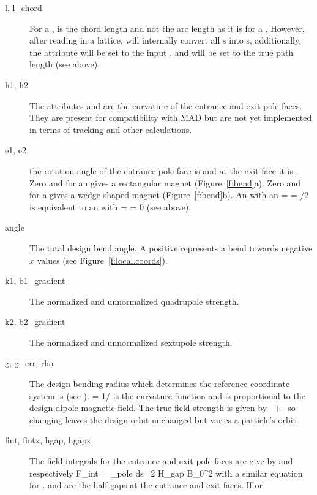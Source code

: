   \begin{description}
  \item[l, l_chord]  \Newline
For a ,  is the chord length and not the arc length as
it is for a .  However, after reading in a lattice, \bmad will
internally convert all s into s, additionally, the
 attribute will be set to the input , and  
will be set to the true path length (see above).
  \item[h1, h2] \Newline
The attributes  and  are the curvature of the entrance
and exit pole faces. They are present for compatibility with MAD but
are not yet implemented in terms of tracking and other calculations.
  \item[e1, e2] \Newline
the rotation angle of the entrance pole face is  and at the
exit face it is . Zero  and  for an 
gives a rectangular magnet  (Figure~\ref{f:bend}a). Zero  and 
for a  gives a wedge shaped magnet (Figure~\ref{f:bend}b).
An  with an  =  =
/2 is equivalent to an  with  =  =
0 (see above).
  \item[angle] \Newline
The total design bend angle. A positive  represents a
bend towards negative $x$ values (see Figure~\ref{f:local.coords}).
  \item[k1, b1_gradient] \Newline
{}
The normalized and unnormalized quadrupole strength.
  \item[k2, b2_gradient] \Newline
{}
The normalized and unnormalized sextupole strength. 
  \item[g, g_err, rho] \Newline
{}
The design bending radius which determines the reference coordinate
system is  (see ).   = 1/ is
the curvature function and is proportional to the design dipole
magnetic field. The true field strength is given by
~+~ so changing  leaves the design orbit
unchanged but varies a particle's orbit.
  \item[fint, fintx, hgap, hgapx] \Newline
The field integrals for the entrance and
exit pole faces are give by  and  respectively
\Begineq
  F_{int} = \int_{pole} \! \! ds \, 
  {2 H_{gap} B_0^2}
\Endeq
{}
with a similar equation for .  and  are
the half gaps at the entrance and exit faces. If  or

\end{description}
